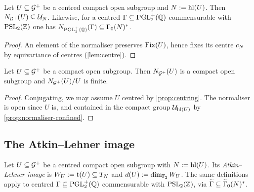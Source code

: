 \begin{proposition}\label{prop:normaliser-confined}
Let $U \subseteq \mathcal{G}^{+}$ be a centred compact open subgroup and
$N := \operatorname{hl}(U)$. Then $N_{\mathcal{G}^{+}}(U) \subseteq
\mathcal{U}_{N}$. Likewise, for a centred $\Gamma \subseteq \mathrm{PGL}_{2}^{+}(\mathbb{Q})$
commensurable with $\PSL{2}{\ZZ}$ one has
$\Normalizer{\RationalProjGroup}{\Gamma} \subseteq \GammaZeroStar{N}$.
\end{proposition}

\begin{proof}
An element of the normaliser preserves $\mathrm{Fix}(U)$, hence fixes its
centre $c_{N}$ by equivariance of centres (\cref{lem:centre}).
\end{proof}

\begin{proposition}
\label{prop:normaliser-compact-open}
Let $U \subseteq \mathcal{G}^{+}$ be a compact open subgroup. Then
$N_{\mathcal{G}^{+}}(U)$ is a compact open subgroup and
$N_{\mathcal{G}^{+}}(U)/U$ is finite.
\end{proposition}

\begin{proof}
Conjugating, we may assume $U$ centred by \cref{prop:centring}. The
normaliser is open since $U$ is, and contained in the compact group
$\mathcal{U}_{\operatorname{hl}(U)}$ by \cref{prop:normaliser-confined}.
\end{proof}

\subsection{The Atkin--Lehner image}

\begin{definition}\label{def:al-image}
Let $U \subseteq \mathcal{G}^{+}$ be a centred compact open subgroup with
$N := \operatorname{hl}(U)$. Its \emph{Atkin--Lehner image} is
$W_{U} := \mathrm{t}(U) \subseteq T_{N}$ and
$d(U) := \dim_{\mathbb{F}_{2}}W_{U}$. The same definitions apply to
centred $\Gamma \subseteq \mathrm{PGL}_{2}^{+}(\mathbb{Q})$ commensurable with
$\PSL{2}{\ZZ}$, via $\lifted{\Gamma} \subseteq \GammaZeroStar[lift]{N}$.
\end{definition}

